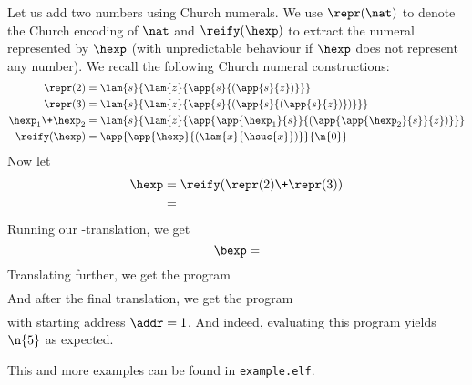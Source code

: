 Let us add two numbers using Church numerals.
We use $\repr(\nat)$ to denote the Church encoding of $\nat$ and $\reify(\hexp)$ to extract the numeral represented by $\hexp$ (with unpredictable behaviour if $\hexp$ does not represent any number).
We recall the following Church numeral constructions:
\begin{align*}
  \repr(2) &= \lam{s}{\lam{z}{\app{s}{(\app{s}{z})}}} \\
  \repr(3) &= \lam{s}{\lam{z}{\app{s}{(\app{s}{(\app{s}{z})})}}} \\
  \hexp_1 \+ \hexp_2 &= \lam{s}{\lam{z}{\app{\app{\hexp_1}{s}}{(\app{\app{\hexp_2}{s}}{z})}}} \\
  \reify(\hexp) &= \app{\app{\hexp}{(\lam{x}{\hsuc{x}})}}{\n{0}}
\end{align*}
Now let
\begin{align*}
  \hexp &= \reify(\repr(2) \+ \repr(3)) \\
  &= 
\end{align*}
Running our \hlang-\blang translation, we get
\[
\bexp = 
\]
Translating further, we get the \slang program
{\footnotesize
\begin{align*}
\quad 
\end{align*}
}
And after the final translation, we get the \mlang program
{\footnotesize
\begin{align*}

\end{align*}
}
with starting address $\addr = 1$.
And indeed, evaluating this program yields $\n{5}$ as expected.

\Twelf
This and more examples can be found in \texttt{example.elf}.
